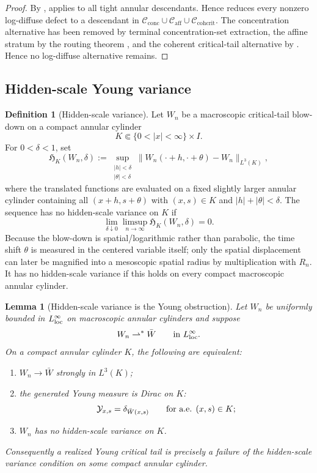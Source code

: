 \documentclass[11pt]{amsart}
\numberwithin{equation}{section}
\theoremstyle{plain}
\newtheorem{lemma}[lemma]{Lemma}
\theoremstyle{definition}
\newtheorem{definition}[definition]{Definition}
\theoremstyle{remark}
\newcommand{\Cactive}{\mathcal C_{\mathrm{conc}}}
\newcommand{\Caff}{\mathcal C_{\mathrm{aff}}}
\newcommand{\Ccohcrit}{\mathcal C_{\mathrm{cohcrit}}}
\begin{document}
\begin{proof}
By ,
 applies to all tight
annular descendants.  Hence  reduces
every nonzero log-diffuse defect to a descendant in
\(\Cactive\cup\Caff\cup\Ccohcrit\).  The concentration alternative has been removed by
terminal concentration-set extraction, the affine stratum by
the routing theorem , and the coherent critical-tail
alternative by .  Hence no
log-diffuse alternative remains.
\end{proof}

\subsection{Hidden-scale Young variance}
\label{subsec:hidden-scale-young-variance}

\begin{definition}[Hidden-scale variance]
\label{def:hidden-scale-variance}
Let \(W_n\) be a macroscopic critical-tail blow-down on a compact annular
cylinder
\[
   K\Subset\{0<|x|<\infty\}\times I .
\]
For \(0<\delta<1\), set
\[
   \mathfrak H_K(W_n,\delta)
   :=
   \sup_{\substack{|h|<\delta\\ |\theta|<\delta}}
   \|W_n(\cdot+h,\cdot+\theta)-W_n\|_{L^3(K)} ,
\]
where the translated functions are evaluated on a fixed slightly larger
annular cylinder containing all \((x+h,s+\theta)\) with
\((x,s)\in K\) and \(|h|+|\theta|<\delta\).  The sequence has no hidden-scale
variance on \(K\) if
\[
   \lim_{\delta\downarrow0}\limsup_{n\to\infty}
   \mathfrak H_K(W_n,\delta)=0 .
\]
Because the blow-down is spatial/logarithmic rather than parabolic, the time
shift \(\theta\) is measured in the centered variable itself; only the spatial
displacement can later be magnified into a mesoscopic spatial radius by
multiplication with \(R_n\).
It has no hidden-scale variance if this holds on every compact macroscopic
annular cylinder.
\end{definition}

\begin{lemma}[Hidden-scale variance is the Young obstruction]
\label{lem:hidden-variance-young-obstruction}
Let \(W_n\) be uniformly bounded in \(L^\infty_{\rm loc}\) on macroscopic
annular cylinders and suppose
\[
   W_n\rightharpoonup^\ast \bar W
   \qquad\hbox{in }L^\infty_{\rm loc}.
\]
On a compact annular cylinder \(K\), the following are equivalent:
\begin{enumerate}[label=\textup{(\roman*)}]
   \item \(W_n\to\bar W\) strongly in \(L^3(K)\);
   \item the generated Young measure is Dirac on \(K\):
   \[
      \mathcal Y_{x,s}=\delta_{\bar W(x,s)}
      \qquad\hbox{for a.e. }(x,s)\in K;
   \]
   \item \(W_n\) has no hidden-scale variance on \(K\).
\end{enumerate}
Consequently a realized Young critical tail is precisely a failure of the
hidden-scale variance condition on some compact annular cylinder.
\end{lemma}
\end{document}
